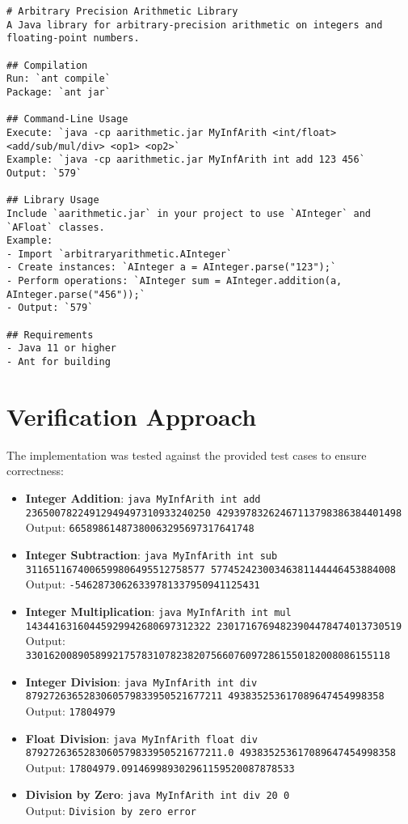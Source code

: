 \documentclass[12pt]{article}
\begin{document}
\begin{verbatim}
# Arbitrary Precision Arithmetic Library
A Java library for arbitrary-precision arithmetic on integers and floating-point numbers.

## Compilation
Run: `ant compile`
Package: `ant jar`

## Command-Line Usage
Execute: `java -cp aarithmetic.jar MyInfArith <int/float> <add/sub/mul/div> <op1> <op2>`
Example: `java -cp aarithmetic.jar MyInfArith int add 123 456`
Output: `579`

## Library Usage
Include `aarithmetic.jar` in your project to use `AInteger` and `AFloat` classes.
Example:
- Import `arbitraryarithmetic.AInteger`
- Create instances: `AInteger a = AInteger.parse("123");`
- Perform operations: `AInteger sum = AInteger.addition(a, AInteger.parse("456"));`
- Output: `579`

## Requirements
- Java 11 or higher
- Ant for building
\end{verbatim}

\section{Verification Approach}
The implementation was tested against the provided test cases to ensure correctness:

\begin{itemize}
    \item \textbf{Integer Addition}: \texttt{java MyInfArith int add 23650078224912949497310933240250 42939783262467113798386384401498} \\ Output: \texttt{66589861487380063295697317641748}
    \item \textbf{Integer Subtraction}: \texttt{java MyInfArith int sub 3116511674006599806495512758577 57745242300346381144446453884008} \\ Output: \texttt{-54628730626339781337950941125431}
    \item \textbf{Integer Multiplication}: \texttt{java MyInfArith int mul 14344163160445929942680697312322 23017167694823904478474013730519} \\ Output: \texttt{330162008905899217578310782382075660760972861550182008086155118}
    \item \textbf{Integer Division}: \texttt{java MyInfArith int div 8792726365283060579833950521677211 493835253617089647454998358} \\ Output: \texttt{17804979}
    \item \textbf{Float Division}: \texttt{java MyInfArith float div 8792726365283060579833950521677211.0 493835253617089647454998358} \\ Output: \texttt{17804979.091469989302961159520087878533}
    \item \textbf{Division by Zero}: \texttt{java MyInfArith int div 20 0} \\ Output: \texttt{Division by zero error}
\end{itemize}
\end{document}
